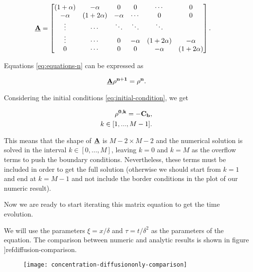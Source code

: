 \begin{align}
\bf{\underline{A}} &= \begin{bmatrix}
           ( 1 + \alpha ) & -\alpha  &  0 & 0 &  \cdots & 0\\
             -\alpha & ( 1 + 2 \alpha ) & -\alpha & \cdots & 0 & 0\\
           \vdots  &\cdots  & \ddots & \ddots &  \ddots&  \\
            \vdots & \cdots & 0  &  -\alpha & ( 1 + 2 \alpha ) & -\alpha \\
            0 & \cdots &0  & 0 & -\alpha & ( 1 + 2 \alpha )
         \end{bmatrix}
         \label{eq:discretization-matrix}.
\end{align}

Equations \ref{eq:equations-n} can be expressed as

\begin{align}
    \bf{\underline{A}} \bf{\rho^{n+1}}  = \bf{\rho^n} .
\end{align}

Considering the initial conditions \ref{eq:initial-condition}, we get

\begin{align}
    \bf{\rho^{0,k}} = -C_b, \\
    k \in [1,..., M-1].
\end{align}

This means that the shape of $\bf{\underline{A}}$ is $M-2 \times M-2$ and the numerical solution is solved in the interval  $k \in [0,..., M]$, leaving $k=0$ and $k=M$ as the overflow terms to push the boundary conditions. Nevertheless, these terms must be included in order to get the full solution (otherwise we should start from $k=1$ and end at $k=M-1$ and not include the border conditions in the plot of our numeric result).

Now we are ready to start iterating this matrix equation to get the time evolution.

We will use the parameters $\xi = x/\delta$ and $\tau = t/\delta^2$ as the parameters of the equation. The comparison between numeric and analytic results is shown in figure ]ref{diffusion-comparison}.

\begin{figure}[htbp]
\centering
\texttt{[image: concentration-diffusiononly-comparison]}
\caption{}
\label{fig:diffusion-comparison}
\end{figure}


